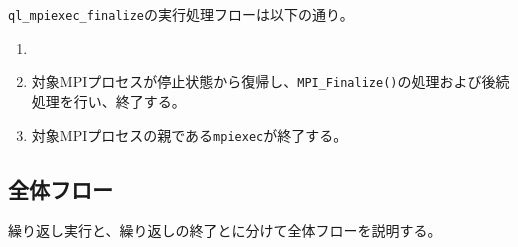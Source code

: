 \documentclass[twoside,11pt,fleqn]{book}
\begin{document}
{{\texttt{ql\_mpiexec\_finalize}の実行処理フローは以下の通り。
\begin{enumerate}
\item {}
\item 対象MPIプロセスが停止状態から復帰し、\texttt{MPI\_Finalize()}の処理および後続処理を行い、終了する。
\item 対象MPIプロセスの親である\texttt{mpiexec}が終了する。
\end{enumerate}
}

\subsection{全体フロー}
繰り返し実行と、繰り返しの終了とに分けて全体フローを説明する。

}
\end{document}
